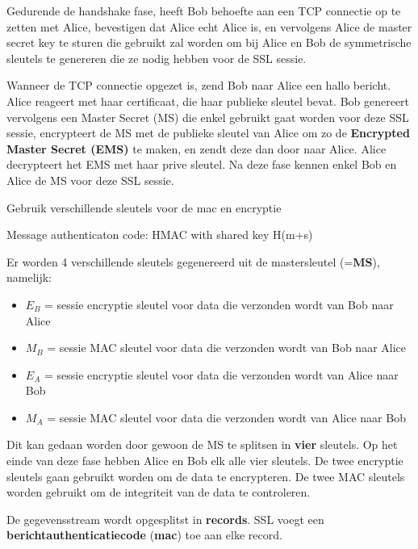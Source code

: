 \noindent Gedurende de handshake fase, heeft Bob behoefte aan een TCP connectie op te zetten met Alice, bevestigen dat Alice echt Alice is, en vervolgens Alice de master secret key te sturen die gebruikt zal worden om bij Alice en Bob de symmetrische sleutels te genereren die ze nodig hebben voor de SSL sessie.

\noindent Wanneer de TCP connectie opgezet is, zend Bob naar Alice een hallo bericht. Alice reageert met haar certificaat, die haar publieke sleutel bevat. Bob genereert vervolgens een Master Secret (MS) die enkel gebruikt gaat worden voor deze SSL sessie, encrypteert de MS met de publieke sleutel van Alice om zo de \textbf{Encrypted Master Secret (EMS)} te maken, en zendt deze dan door naar Alice. Alice decrypteert het EMS met haar prive sleutel. Na deze fase kennen enkel Bob en Alice de MS voor deze SSL sessie.




\noindent Gebruik verschillende sleutels voor de \acrfull{mac} en encryptie

\noindent Message authenticaton code: HMAC with shared key H(m+s)

\noindent Er worden 4 verschillende sleutels gegenereerd uit de mastersleutel (=\textbf{MS}), namelijk:
\begin{itemize}
\item $E_B$ = sessie encryptie sleutel voor data die verzonden wordt van Bob naar Alice
\item $M_B$ = sessie MAC sleutel voor data die verzonden wordt van Bob naar Alice
\item $E_A$ = sessie encryptie sleutel voor data die verzonden wordt van Alice naar Bob
\item $M_A$ = sessie MAC sleutel voor data die verzonden wordt van Alice naar Bob
\end{itemize}

\noindent Dit kan gedaan worden door gewoon de MS te splitsen in \textbf{vier} sleutels. Op het einde van deze fase hebben Alice en Bob elk alle vier sleutels. De twee encryptie sleutels gaan gebruikt worden om de data te encrypteren. De twee MAC sleutels worden gebruikt om de integriteit van de data te controleren.



De gegevensstream wordt opgesplitst in \textbf{records}. SSL voegt een \textbf{berichtauthenticatiecode} (\textbf{\acrshort{mac}}) toe aan elke record.

